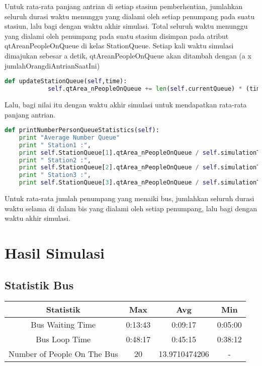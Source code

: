 \documentclass{article}
\begin{document}
Untuk rata-rata panjang antrian di setiap stasiun pemberhentian, jumlahkan seluruh durasi waktu menunggu yang dialami oleh setiap penumpang pada suatu stasiun, lalu bagi dengan waktu akhir simulasi. Total seluruh waktu menunggu yang dialami oleh penumpang pada suatu stasiun disimpan pada atribut qtAreanPeopleOnQueue di kelas StationQueue. Setiap kali waktu simulasi dimajukan sebesar a detik, qtAreanPeopleOnQueue akan ditambah dengan (a x jumlahOrangdiAntrianSaatIni)
\begin{lstlisting}[language=Python]
def updateStationQueue(self,time):
			self.qtArea_nPeopleOnQueue += len(self.currentQueue) * (time - self.simulationTime)
\end{lstlisting}
Lalu, bagi nilai itu dengan waktu akhir simulasi untuk mendapatkan rata-rata panjang antrian.
\begin{lstlisting}[language=Python]
def printNumberPersonQueueStatistics(self):
	print "Average Number Queue"
	print "	Station1 :",
	print self.StationQueue[1].qtArea_nPeopleOnQueue / self.simulationTime
	print "	Station2 :",
	print self.StationQueue[2].qtArea_nPeopleOnQueue / self.simulationTime
	print "	Station3 :",
	print self.StationQueue[3].qtArea_nPeopleOnQueue / self.simulationTime
\end{lstlisting}
Untuk rata-rata jumlah penumpang yang menaiki bus, jumlahkan seluruh durasi waktu selama di dalam bis yang dialami oleh setiap penumpang, lalu bagi dengan waktu akhir simulasi.


\section{Hasil Simulasi}

\subsection{Statistik Bus}

\begin{center}
 \begin{tabular}{||c | c | c | c||} 
 \hline
 Statistik & Max & Avg & Min \\ [0.5ex] 
 \hline\hline
 Bus Waiting Time & 0:13:43 & 0:09:17 & 0:05:00 \\ 
 \hline
 Bus Loop Time & 0:48:17 & 0:45:15 & 0:38:12 \\
 \hline
 Number of People On The Bus & 20 & 13.9710474206 & - \\
 \hline
\end{tabular}
\end{center}
\end{document}
